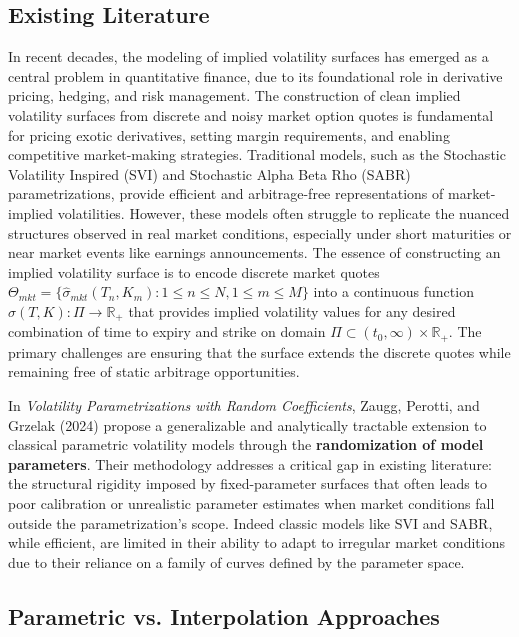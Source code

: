 \subsection{Existing Literature}

In recent decades, the modeling of implied volatility surfaces has emerged as a central problem in quantitative finance, due to its foundational role in derivative pricing, hedging, and risk management.
The construction of clean implied volatility surfaces from discrete and noisy market option quotes is fundamental for pricing exotic derivatives, setting margin requirements, and enabling competitive market-making strategies.
Traditional models, such as the Stochastic Volatility Inspired (SVI) and Stochastic Alpha Beta Rho (SABR) parametrizations, provide efficient and arbitrage-free representations of market-implied volatilities.
However, these models often struggle to replicate the nuanced structures observed in real market conditions, especially under short maturities or near market events like earnings announcements.
The essence of constructing an implied volatility surface is to encode discrete market quotes $\Theta_{mkt} = \{\hat{\sigma}_{mkt}(T_n, K_m) : 1 \leq n \leq N, 1 \leq m \leq M\}$ into a continuous function $\hat{\sigma}(T,K): \Pi \rightarrow \mathbb{R}_+$ that provides implied volatility values for any desired combination of time to expiry and strike on domain $\Pi \subset (t_0, \infty) \times \mathbb{R}_+$.
The primary challenges are ensuring that the surface extends the discrete quotes while remaining free of static arbitrage opportunities.

In \textit{Volatility Parametrizations with Random Coefficients}, Zaugg, Perotti, and Grzelak (2024) \cite{zaugg2024volatility} propose a generalizable and analytically tractable extension to classical parametric volatility models through the \textbf{randomization of model parameters}.
Their methodology addresses a critical gap in existing literature: the structural rigidity imposed by fixed-parameter surfaces that often leads to poor calibration or unrealistic parameter estimates when market conditions fall outside the parametrization's scope.
Indeed classic models like SVI and SABR, while efficient, are limited in their ability to adapt to irregular market conditions due to their reliance on a family of curves defined by the parameter space.

\subsection{Parametric vs. Interpolation Approaches}

